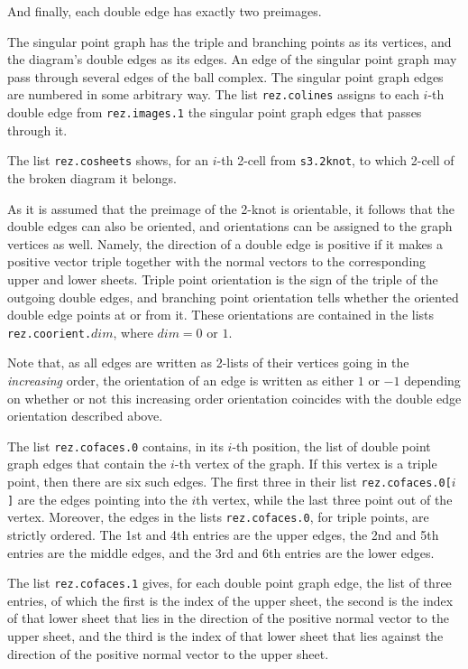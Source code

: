\documentclass[a4paper,11pt]{report}
\begin{document}
{{{\begin{Verbatim}[commandchars=!@|,fontsize=\small,frame=single,label=Example]
\end{Verbatim}
 And finally, each double edge has exactly two preimages. 

 The singular point graph has the triple and branching points as its vertices,
and the diagram's double edges as its edges. An edge of the singular point
graph may pass through several edges of the ball complex. The singular point
graph edges are numbered in some arbitrary way. The list \texttt{rez.colines} assigns to each $i$-th double edge from \texttt{rez.images.1} the singular point graph edges that passes through it. 

 The list \texttt{rez.cosheets} shows, for an $i$-th 2-cell from \texttt{s3.2knot}, to which 2-cell of the broken diagram it belongs. 

 As it is assumed that the preimage of the 2-knot is orientable, it follows
that the double edges can also be oriented, and orientations can be assigned
to the graph vertices as well. Namely, the direction of a double edge is
positive if it makes a positive vector triple together with the normal vectors
to the corresponding upper and lower sheets. Triple point orientation is the
sign of the triple of the outgoing double edges, and branching point
orientation tells whether the oriented double edge points at or from it. These
orientations are contained in the lists \texttt{rez.coorient.}$dim$, where $dim=0$ or $1$. 

 Note that, as all edges are written as 2-lists of their vertices going in the \emph{increasing} order, the orientation of an edge is written as either $1$ or $-1$ depending on whether or not this increasing order orientation coincides with
the double edge orientation described above. 

 The list \texttt{rez.cofaces.0} contains, in its $i$-th position, the list of double point graph edges that contain the $i$-th vertex of the graph. If this vertex is a triple point, then there are six
such edges. The first three in their list \texttt{rez.cofaces.0[}$i$\texttt{]} are the edges pointing into the $i$th vertex, while the last three point out of the vertex. Moreover, the edges
in the lists \texttt{rez.cofaces.0}, for triple points, are strictly ordered. The 1st and 4th entries are the
upper edges, the 2nd and 5th entries are the middle edges, and the 3rd and 6th
entries are the lower edges. 

 The list \texttt{rez.cofaces.1} gives, for each double point graph edge, the list of three entries, of which
the first is the index of the upper sheet, the second is the index of that
lower sheet that lies in the direction of the positive normal vector to the
upper sheet, and the third is the index of that lower sheet that lies against
the direction of the positive normal vector to the upper sheet. }

 }

 }
\end{document}
